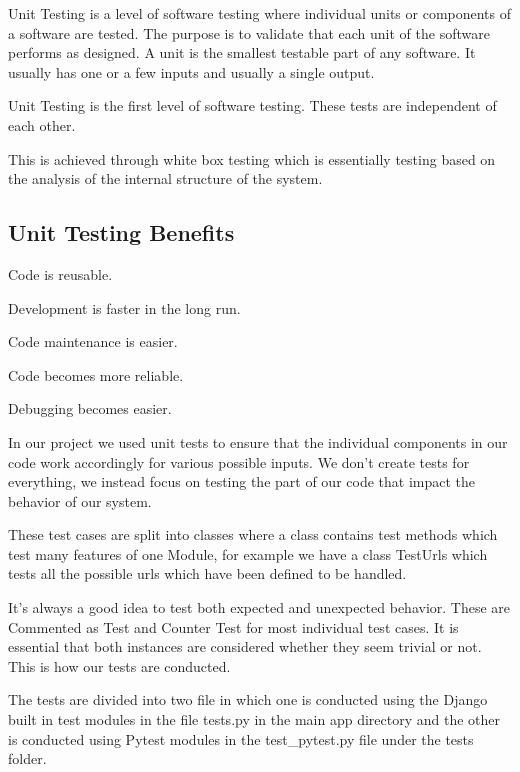\documentclass[10pt]{article}
\begin{document}
Unit Testing is a level of software testing where individual units or components of a software are tested. The purpose is to validate that each unit of the software performs as designed. A unit is the smallest testable part of any software. It usually has one or a few inputs and usually a single output.

Unit Testing is the first level of software testing. These tests are independent of each other.

This is achieved through white box testing which is essentially testing based on the analysis of the internal structure of the system.

\subsection{Unit Testing Benefits}

\begin{description}[font=$\bullet$~\normalfont\scshape\color{red!50!black}]

\item [] Code is reusable.
\item [] Development is faster in the long run.
\item [] Code maintenance is easier.
\item [] Code becomes more reliable.
\item [] Debugging becomes easier.

\end{description}

In our project we used unit tests to ensure that the individual components in our code work accordingly for various possible inputs. We don't create tests for everything, we instead focus on testing the part of our code that impact the behavior of our system.

These test cases are split into classes where a class contains test methods which test many features of one Module, for example we have a class TestUrls which tests all the possible urls which have been defined to be handled.

It’s always a good idea to test both expected and unexpected behavior. These are Commented as Test and Counter Test for most individual test cases. It is essential that both instances are considered whether they seem trivial or not. This is how our tests are conducted.

The tests are divided into two file in which one is conducted using the Django built in test modules in the file tests.py  in the main app directory and the other is conducted using Pytest modules in the test\_pytest.py file under the tests folder.
\end{document}
